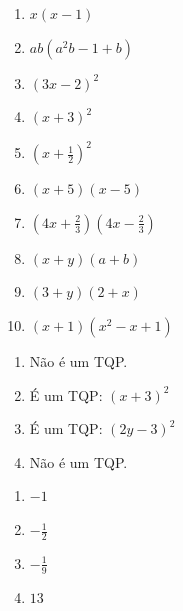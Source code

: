 \begin{respostas}{4}
    \ansitem{} \begin{multicols}{3}
        \begin{enumerate}[label=\alph*)]
            \item $x(x-1)$
            
            \item $ab(a^2b-1+b)$
            
            \item $(3x-2)^2$
            
            \item $(x+3)^2$
            
            \item $(x+\frac{1}{2})^2$
            
            \item $(x+5)(x-5)$
            
            \item $(4x+\frac{2}{3})(4x-\frac{2}{3})$
            
            \item $(x+y)(a+b)$
            
            \item $(3+y)(2+x)$
            
            \item $(x+1)(x^2-x+1)$
        \end{enumerate}
    \end{multicols}
    
    \ansitem{} \begin{multicols}{2}
        \begin{enumerate}[label=\alph*)]
            \item Não é um TQP.
            
            \item É um TQP: $(x+3)^2$
            
            \item É um TQP: $(2y-3)^2$
            
            \item Não é um TQP.
        \end{enumerate}
    \end{multicols}

    \ansitem{} \begin{multicols}{4}
        \begin{enumerate}[label=\alph*)]
            \item $-1$
            
            \item $-\frac{1}{2}$
            
            \item $-\frac{1}{9}$
            
            \item $13$
        \end{enumerate}
    \end{multicols}
\end{respostas}
